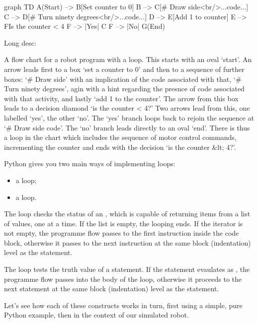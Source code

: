 \documentclass[letterpaper,10pt,english]{sphinxmanual}
\begin{document}
graph TD
    A(Start) --> B[Set counter to 0]
    B --> C[# Draw side<br/>...code...]
    C --> D[# Turn ninety degrees<br/>...code...]
    D --> E[Add 1 to counter]
    E --> F{Is the counter < 4}
    F --> |Yes| C
    F --> |No| G(End)

Long desc:

A flow chart for a robot program with a loop. This starts with an oval ‘start’. An arrow leads first to a box ‘set a counter to 0’ and then to a sequence of further boxes: ‘# Draw side’ with an implication of the code associated with that, ‘# Turn ninety degrees’, agin with a hint regarding the presnce of code associated with that activity, and lastly ‘add 1 to the counter’. The arrow from this box leads to a decision diamond ‘is the counter < 4?’ Two arrows lead from this, one labelled ‘yes’, the other ‘no’. The ‘yes’ branch loops back to rejoin the sequence at ‘# Draw side code’. The ‘no’ branch leads directly to an oval ‘end’. There is thus a loop in the chart which includes the sequence of motor control commands, incrementing the counter and ends with the decision ‘is the counter &lt; 4?’.

Python gives you two main ways of implementing loops:
\begin{itemize}
\item {} 
a  loop;

\item {} 
a  loop.

\end{itemize}

The  loop checks the status of an , which is capable of returning items from a list of values, one at a time. If the list is empty, the looping ends. If the iterator is not empty, the programme flow passes to the first instruction inside the  code block, otherwise it passes to the next instruction at the same block (indentation) level as the  statement.

The  loop tests the truth value of a statement. If the statement evaulates as , the programme flow passes into the body of the loop, otherwise it proceeds to the next statement at the same block (indentation) level as the  statement.

Let’s see how each of these constructs works in turn, first using a simple, pure Python example, then in the context of our simulated robot.
\end{document}
